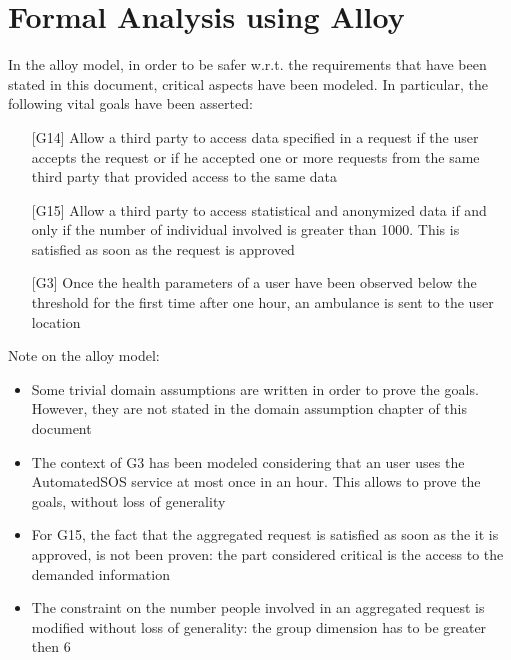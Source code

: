 \section{Formal Analysis using Alloy}
In the alloy model, in order to be safer w.r.t. the requirements that have been stated in this document, critical aspects have been modeled. 
In particular, the following vital goals have been asserted:
\begin{enumerate}
\item[{[G14]}]  Allow a third party to access data specified in a request if the user accepts the request or if he accepted one or more requests from the same third party that provided access to the same data 
\item[{[G15]}] Allow a third party to access statistical and anonymized data if and only if the number of individual involved is greater than 1000. This is satisfied as soon as the request is approved  
\item[{[G3]}] Once the health parameters of a user have been observed below the threshold for the first time after one hour, an ambulance is sent to the user location
\end{enumerate}

Note on the alloy model: 
\begin{itemize}
\item Some trivial domain assumptions are written in order to prove the goals. 
However, they are not stated in the domain assumption chapter of this document 
\item The context of G3 has been modeled considering that an user uses the AutomatedSOS service at most once in an hour. 
This allows to prove the goals, without loss of generality 
\item For G15, the fact that the aggregated request is satisfied as soon as the it is approved, is not been proven: the part considered critical is the access to the demanded information 
\item The constraint on the number people involved in an aggregated request is modified without loss of generality: the group dimension has to be greater then 6 
\end{itemize}



